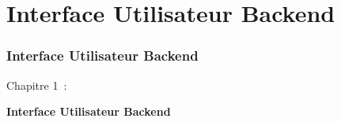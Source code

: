 %

\section{Interface Utilisateur Backend}
\begin{frame}[fragile]
	\frametitle{Interface Utilisateur Backend}

	\begin{center}\huge{Chapitre 1~:}\end{center}
	\begin{center}\huge{\color{typo3darkgrey}\textbf{Interface Utilisateur Backend}}\end{center}

\end{frame}

